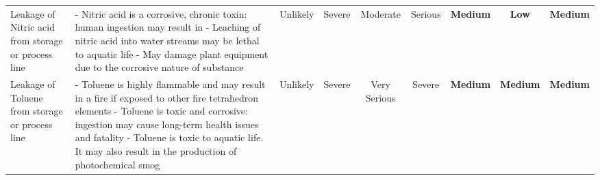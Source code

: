 \begin{landscape}
\begin{table}
\begin{tabularx}{\linewidth}{|X|X|c|c|c|c|c|c|c|}
Leakage of Nitric  acid from storage  or process line                        & - Nitric acid is a corrosive, chronic toxin: human ingestion may result in - Leaching of nitric acid into water streams may  be lethal to aquatic life - May damage plant equipment due to the corrosive  nature of substance                                                                                                                & Unlikely                              & Severe                                                        & Moderate                                                        & Serious                                                               & \cellcolor[HTML]{FCFF2F}\textbf{Medium}                       & \cellcolor[HTML]{34FF34}\textbf{Low}                            & \cellcolor[HTML]{FCFF2F}\textbf{Medium}                                 \\
Leakage of Toluene  from storage  or process line                            & - Toluene is highly flammable and may result in a     fire if exposed to other fire tetrahedron elements - Toluene is toxic and corrosive: ingestion may     cause long-term health issues and fatality   - Toluene is toxic to aquatic life. It may also result  in  the production of photochemical smog                                   & Unlikely                              & Severe                                                        & Very  Serious         & Severe                                                                & \cellcolor[HTML]{FCFF2F}\textbf{Medium}                       & \cellcolor[HTML]{FCFF2F}\textbf{Medium}                         & \cellcolor[HTML]{FCFF2F}\textbf{Medium}                                 
\end{tabularx}
\end{table}
\end{landscape}


